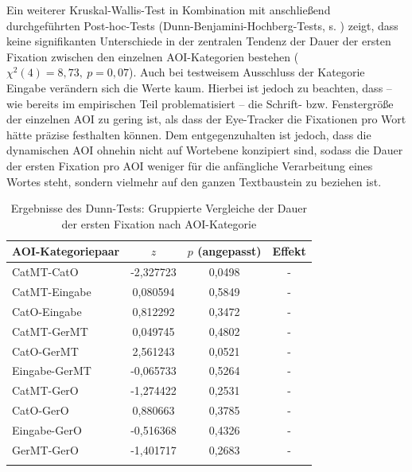 Ein weiterer Kruskal-Wallis-Test in Kombination mit anschließend durchgeführten Post-hoc-Tests (Dunn-Benjamini-Hochberg-Tests, s. ) zeigt, dass keine signifikanten Unterschiede in der zentralen Tendenz der Dauer der ersten Fixation zwischen den einzelnen AOI-Kategorien bestehen ($\chi^2(4) = 8,73,\allowbreak\ p = 0,07$). Auch bei testweisem Ausschluss der Kategorie \glqq Eingabe\grqq{} verändern sich die Werte kaum. Hierbei ist jedoch zu beachten, dass -- wie bereits im empirischen Teil problematisiert -- die Schrift- bzw. Fenstergröße der einzelnen AOI zu gering ist, als dass der Eye-Tracker die Fixationen pro Wort hätte präzise festhalten können. Dem entgegenzuhalten ist jedoch, dass die dynamischen AOI ohnehin nicht auf Wortebene konzipiert sind, sodass die Dauer der ersten Fixation pro AOI weniger für die anfängliche Verarbeitung eines Wortes steht, sondern vielmehr auf den ganzen Textbaustein zu beziehen ist.


\vfill
\begin{table}[H]
\begin{tabular}{lS[table-format=-1.6]S[table-format=1.4]c}  
\lsptoprule
    {AOI-Kategoriepaar} & {$z$} & {$p$ (angepasst)} & {Effekt}\\ 
    \midrule
    CatMT-CatO    & -2,327723 & 0,0498 & - \\ 
    CatMT-Eingabe &  0,080594 & 0,5849 & -  \\ 
    CatO-Eingabe  &  0,812292 & 0,3472 & -  \\ 
    CatMT-GerMT   &  0,049745 & 0,4802 & -  \\ 
    CatO-GerMT    &  2,561243 & 0,0521 & -  \\ 
    Eingabe-GerMT & -0,065733 & 0,5264 & -  \\ 
    CatMT-GerO    & -1,274422 & 0,2531 & -  \\ 
    CatO-GerO     &  0,880663 & 0,3785 & -  \\ 
    Eingabe-GerO  & -0,516368 & 0,4326 & -  \\ 
    GerMT-GerO    & -1,401717 & 0,2683 & -  \\ 
    \lspbottomrule
\end{tabular}
    \caption{Ergebnisse des Dunn-Tests: Gruppierte Vergleiche der Dauer der ersten Fixation nach AOI-Kategorie\label{K6:tab:CatDe:dunntest-ffdur}}
\end{table}
\vfill\pagebreak


